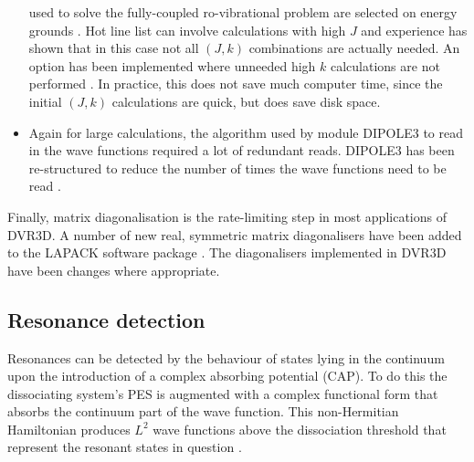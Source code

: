\documentclass[12pt]{article}
\newcommand{\2}{$_{2}$}
\newcommand{\3}{$_{3}$}
\newcommand{\4}{$_{4}$}
\begin{document}
\begin{itemize}
  used to solve the fully-coupled ro-vibrational problem are selected
  on energy grounds \cite{jt66}.  Hot line list can involve
  calculations with high $J$ and experience has shown that in this
  case not all $(J,k)$ combinations are actually needed.  An option
  has been implemented where unneeded high $k$ calculations are not
  performed \cite{jt635}. In practice, this does not save much
  computer time, since the initial $(J,k)$ calculations are quick, but
  does save disk space.
\item Again for large calculations, the
algorithm used by module {\sc DIPOLE3} to read in the wave functions
required a lot of redundant reads. {\sc DIPOLE3} has been re-structured to
reduce the number of times the wave functions need to be read \cite{jt635}.
\end{itemize}


Finally, matrix
diagonalisation is the rate-limiting step in most applications
of {\sc DVR3D}. A number of new real, symmetric matrix diagonalisers
have been added to the  LAPACK software package \cite{99AnBaBi.method}.
The diagonalisers implemented in {\sc DVR3D} have been
changes where appropriate.


\subsection{\label{sec:cap_method} Resonance detection}

Resonances can be detected by the behaviour of states lying in the
continuum upon the introduction of a complex absorbing potential
(CAP). To do this
the dissociating system's PES is augmented with a
complex functional form that absorbs the continuum part of the
wave function. This non-Hermitian Hamiltonian produces
$L^2$ wave functions above the dissociation threshold that represent
the resonant states in question \cite{95RiMexx}.
\end{document}
